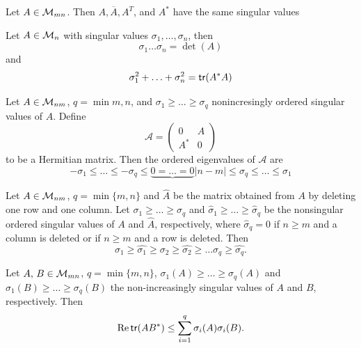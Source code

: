 \documentclass[aspectratio=169]{beamer}
\begin{document}
\begin{frame}
\begin{remark}
	Let $A\in \mathcal{M}_{mn}$. Then $A, \overline{A}, A^T$, and $A^*$ have the same singular values
\end{remark}
\vfill
\begin{remark}
	Let $A\in \mathcal{M}_n$ with singular values $\sigma_1, \dots, \sigma_n$, then 
	\[
		\sigma_1\ldots \sigma_n = \det(A)
	\]
	and 
	\[
		\sigma_1^2+ \ldots+ \sigma_n^2= \mathsf{tr}(A^*A)
	\]
\end{remark}
\end{frame}


\begin{frame}
\begin{theorem}
	Let $A\in \mathcal{M}_{nm}$, $q= \min{m,n}$, and $\sigma_1\geq \dots \geq \sigma_q$ nonincresingly ordered singular values of $A$. Define 
	\[\mathcal{A}= \begin{pmatrix}
	0& A\\
	A^*& 0
	\end{pmatrix}\]
	to be a Hermitian matrix. Then the ordered eigenvalues of $\mathcal{A}$ are 
	\[
		-\sigma_1 \leq \dots \leq -\sigma_q \leq \underbrace{0= \dots = 0}{|n-m|} \leq \sigma_q\leq \dots \leq \sigma_1
	\]
\end{theorem}
\end{frame}



\begin{frame}
\begin{theorem} Let $A\in \mathcal{M}_{nm}$, $q= \min\{m,n\}$ and $\hat{A}$ be the matrix obtained from $A$
	by deleting one row and one column. Let $\sigma_1 \geq \dots \geq \sigma_q$ and $\hat{\sigma}_1\geq \dots \geq \hat{\sigma}_q$ be the nonsingular ordered singular values of $A$ and $\hat{A}$, respectively, where 
	$\hat{\sigma}_q=0$ if $n\geq m$ and a column is deleted or if $n\geq m$ and a row is deleted. Then
	\[\sigma_1 \geq \hat{\sigma_1} \geq \sigma_2 \geq \hat{\sigma_2} \geq \dots \sigma_q \geq \hat{\sigma_q}.\]
\end{theorem}

\begin{theorem} Let $A, \, B\in \mathcal{M}_{mn}$, $q= \min\{m, n\}$, $\sigma_1(A)\geq \dots \geq \sigma_q(A)$ and $\sigma_1(B)\geq \dots \geq \sigma_q(B)$ the non-increasingly singular values of $A$ and $B$, respectively. Then 
	\[\operatorname{Re}\mathsf{tr}(AB^*)\leq \sum\limits_{i=1}^q \sigma_i(A) \sigma_i(B).\]
\end{theorem}
\end{frame}
\end{document}
